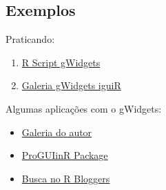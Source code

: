 
\subsection{Exemplos}

\begin{frame}
 Praticando:
  \begin{enumerate}
  \item
    \href{run:./R/gWidgets/gWidgets.R}{R Script gWidgets}
  \item 
    \href{run:gWidgets.html}{Galeria gWidgets iguiR}
  \end{enumerate}

  \vspace{0.5cm}
  Algumas aplicações com o gWidgets:
  \begin{itemize}
  \item \href{http://cran.r-project.org/web/packages/gWidgets/vignettes/}{Galeria
      do autor}
  \item \href{https://github.com/jverzani/ProgGUIinR}{ProGUIinR Package}
  \item \href{http://www.r-bloggers.com/?s=gWidgets}{Busca no R
      Bloggers}
  \end{itemize}
\end{frame}

